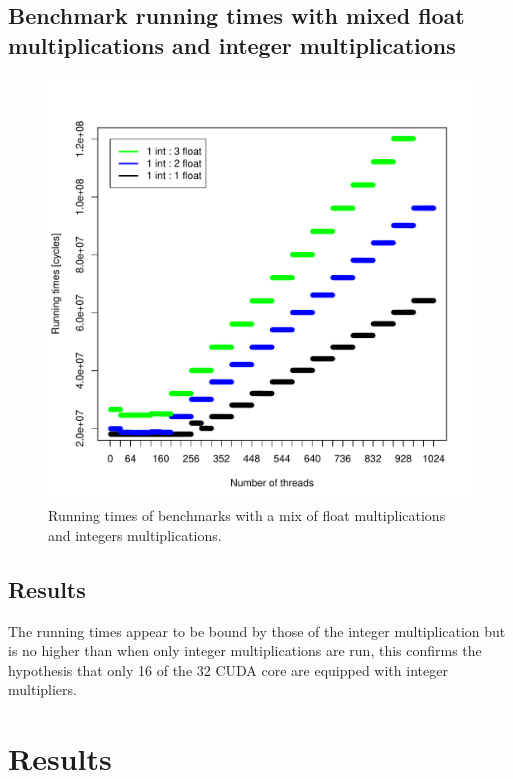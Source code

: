 \documentclass{report}
\def \scalingfactor{.8}
\begin{document}
	\subsection{Benchmark running times with mixed float multiplications and integer multiplications}
	\begin{figure}[H]
		\centering
        \includegraphics[width=\scalingfactor\linewidth]{"graphics/running_times_mixed"}
		\vspace{-15pt}
		\captionsetup{justification=centering}
        \caption{Running times of benchmarks with a mix of float multiplications and integers multiplications.}
    \end{figure}

    \subsection{Results}
    The running times appear to be bound by those of the integer multiplication but is no higher than
    when only integer multiplications are run, this confirms the hypothesis that only 16 of the 32
    CUDA core are equipped with integer multipliers. 

\section{Results}
\end{document}
